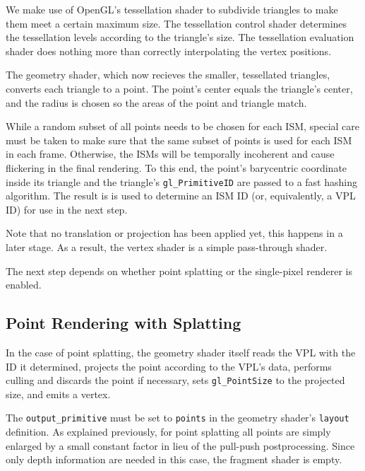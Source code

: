We make use of OpenGL's tessellation shader to subdivide triangles to make them meet a certain maximum size. The tessellation control shader determines the tessellation levels according to the triangle's size. The tessellation evaluation shader does nothing more than correctly interpolating the vertex positions.

The geometry shader, which now recieves the smaller, tessellated triangles, converts each triangle to a point. The point's center equals the triangle's center, and the radius is chosen so the areas of the point and triangle match.


While a random subset of all points needs to be chosen for each ISM, special care must be taken to make sure that the same subset of points is used for each ISM in each frame. Otherwise, the ISMs will be temporally incoherent and cause flickering in the final rendering. To this end, the point's barycentric coordinate inside its triangle and the triangle's \texttt{gl\_PrimitiveID} are passed to a fast hashing algorithm. The result is is used to determine an ISM ID (or, equivalently, a VPL ID) for use in the next step.

Note that no translation or projection has been applied yet, this happens in a later stage. As a result, the vertex shader is a simple pass-through shader.

The next step depends on whether point splatting or the single-pixel renderer is enabled.



\subsection{Point Rendering with Splatting}
\label{sec:impl:splatting}

In the case of point splatting, the geometry shader itself reads the VPL with the ID it determined, projects the point according to the VPL's data, performs culling and discards the point if necessary, sets \texttt{gl\_PointSize} to the projected size, and emits a vertex.

The \texttt{output\_primitive} must be set to \texttt{points} in the geometry shader's \texttt{layout} definition. As explained previously, for point splatting all points are simply enlarged by a small constant factor in lieu of the pull-push postprocessing. Since only depth information are needed in this case, the fragment shader is empty.



